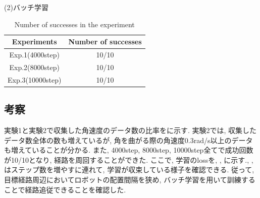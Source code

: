 \newpage
\begin{description}
  \item [(2)バッチ学習]
\end{description}
\begin{table}[h]
  \centering
  \begin{tabular}{|c|c|} \hline
    Experiments & Number of successes \\ \hline
    Exp.1(4000step) & 10/10 \\ \hline
    Exp.2(8000step) & 10/10 \\ \hline
    Exp.3(10000step) & 10/10 \\ \hline
  \end{tabular}
  \caption{Number of successes in the experiment}
  \label{tb:exp2.2}
\end{table}

\subsection{考察}
実験1と実験2で収集した角速度のデータ数の比率をに示す. 実験2では, 収集したデータ数全体の数も増えているが, 角を曲がる際の角速度0.3rad/s以上のデータも増えていることが分かる. また, 4000step, 8000step, 10000step全てで成功回数が10/10となり, 経路を周回することができた. ここで, 学習のlossを, , に示す., , はステップ数を増やすに連れて, 学習が収束している様子を確認できる. 従って, 目標経路周辺においてロボットの配置間隔を狭め, バッチ学習を用いて訓練することで経路追従できることを確認した. 

